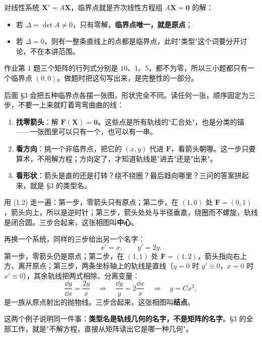 \documentclass[11pt]{ctexart}
\newcommand{\X}{\mathbf{X}}\newcommand{\Y}{\mathbf{Y}}
\newcommand{\F}{\mathbf{F}}
\begin{document}

对线性系统 $\X'=A\X$，临界点就是齐次线性方程组 $A\X=\mathbf{0}$ 的解：

\begin{itemize}
\item 若 $\Delta=\det A\neq0$，只有零解，\textbf{临界点唯一，就是原点}；
\item 若 $\Delta=0$，则有一整条直线上的点都是临界点，此时"类型"这个词要分开讨论，不在本讲范围。
\end{itemize}

作业第 1 题三个矩阵的行列式分别是 $10$、$1$、$5$，都不为零，所以三小题都只有一个临界点 $(0,0)$。做题时把这句写出来，是完整性的一部分。


后面 §3 会把五种临界点各摆一张图，形状完全不同。读任何一张，顺序固定为三步，不要一上来就盯着弯弯曲曲的线：

\begin{enumerate}
\item \textbf{找零箭头}：解 $\F(\X)=\mathbf{0}$。这些点是所有轨线的"汇合处"，也是分类的锚——一张图里可以只有一个，也可以有一串。
\item \textbf{看方向}：挑一个非临界点，把它的 $(x,y)$ 代进 $\F$，看箭头朝哪。这一步只要算术，不用解方程；方向定了，才知道轨线是"进去"还是"出来"。
\item \textbf{看形状}：箭头是直的还是打转？绕不绕圈？最后趋向哪里？三问的答案拼起来，就是 §3 的类型名。
\end{enumerate}

用 (1.2) 走一遍：第一步，零箭头只有原点；第二步，在 $(1,0)$ 处 $\F=(0,1)$，箭头向上，所以是逆时针；第三步，箭头处处与半径垂直，绕圈而不螺旋，轨线是闭合圆。三步合起来，这张相图叫\textbf{中心}。

再换一个系统，同样的三步给出另一个名字：
\[
x'=x,\qquad y'=2y .
\]
第一步，零箭头仍是原点；第二步，在 $(1,1)$ 处 $\F=(1,2)$，箭头指向右上方、离开原点；第三步，两条坐标轴上的轨线是直线（$y=0$ 时 $y'\equiv0$，$x=0$ 时 $x'\equiv0$），其余轨线把两式相除、分离变量：
\[
\frac{\dd y}{\dd x}=\frac{2y}{x}
\quad\Longrightarrow\quad
\frac{\dd y}{y}=2\frac{\dd x}{x}
\quad\Longrightarrow\quad
y=Cx^{2},
\]
是一族从原点射出的抛物线。三步合起来，这张相图叫\textbf{结点}。

这两个例子说明同一件事：\textbf{类型名是轨线几何的名字，不是矩阵的名字}。§3 的全部工作，就是"不解方程，直接从矩阵读出它是哪一种几何"。

\end{document}
